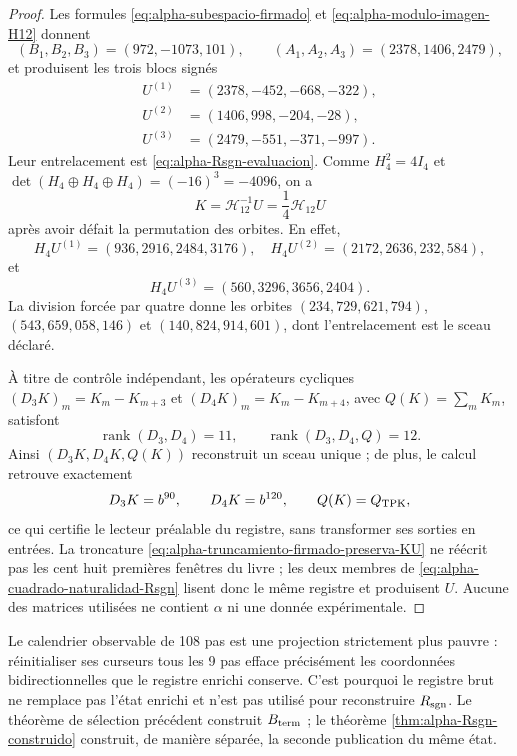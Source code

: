 \begin{proof}
Les formules \eqref{eq:alpha-subespacio-firmado} et
\eqref{eq:alpha-modulo-imagen-H12} donnent
\[
 (B_1,B_2,B_3)=(972,-1073,101),\qquad
 (A_1,A_2,A_3)=(2378,1406,2479),
\]
et produisent les trois blocs signés
\[
\begin{aligned}
 U^{(1)}&=(2378,-452,-668,-322),\\
 U^{(2)}&=(1406,998,-204,-28),\\
 U^{(3)}&=(2479,-551,-371,-997).
\end{aligned}
\]
Leur entrelacement est \eqref{eq:alpha-Rsgn-evaluacion}. Comme
\(H_4^2=4I_4\) et
\(\det(H_4\oplus H_4\oplus H_4)=(-16)^3=-4096\), on a
\begin{equation}\label{eq:alpha-Rsgn-inversa}
 K=\mathcal H_{12}^{-1}U
 =\frac14\mathcal H_{12}U
\end{equation}
après avoir défait la permutation des orbites. En effet,
\[
 H_4U^{(1)}=(936,2916,2484,3176),\quad
 H_4U^{(2)}=(2172,2636,232,584),
\]
et
\[
 H_4U^{(3)}=(560,3296,3656,2404).
\]
La division forcée par quatre donne les orbites
\((234,729,621,794)\), \((543,659,058,146)\) et
\((140,824,914,601)\), dont l'entrelacement est le sceau déclaré.

À titre de contrôle indépendant, les opérateurs cycliques
\((D_3K)_m=K_m-K_{m+3}\) et
\((D_4K)_m=K_m-K_{m+4}\), avec \(Q(K)=\sum_mK_m\), satisfont
\begin{equation}\label{eq:alpha-extractor-90-120}
 \operatorname{rank}(D_3,D_4)=11,
 \qquad
 \operatorname{rank}(D_3,D_4,Q)=12.
\end{equation}
Ainsi \((D_3K,D_4K,Q(K))\) reconstruit un sceau unique ; de plus, le
calcul retrouve exactement
\[
 D_3K=b^{90},\qquad D_4K=b^{120},\qquad Q(K)=Q_{\rm TPK},
\]
ce qui certifie le lecteur préalable du registre, sans transformer ses sorties
en entrées. La troncature
\eqref{eq:alpha-truncamiento-firmado-preserva-KU} ne réécrit pas les cent huit premières
fenêtres du livre ; les deux membres de
\eqref{eq:alpha-cuadrado-naturalidad-Rsgn} lisent donc le même registre et
produisent \(U\). Aucune des matrices utilisées ne contient \(\alpha\) ni
une donnée expérimentale.
\end{proof}

Le calendrier observable de 108 pas est une projection strictement plus
pauvre : réinitialiser ses curseurs tous les 9 pas efface précisément les
coordonnées bidirectionnelles que le registre enrichi conserve. C'est
pourquoi le registre brut ne remplace pas l'état enrichi et n'est pas utilisé pour
reconstruire \(R_{\rm sgn}\). Le théorème de sélection précédent construit
\(B_{\rm term}\) ; le théorème \ref{thm:alpha-Rsgn-construido} construit, de
manière séparée, la seconde publication du même état.

